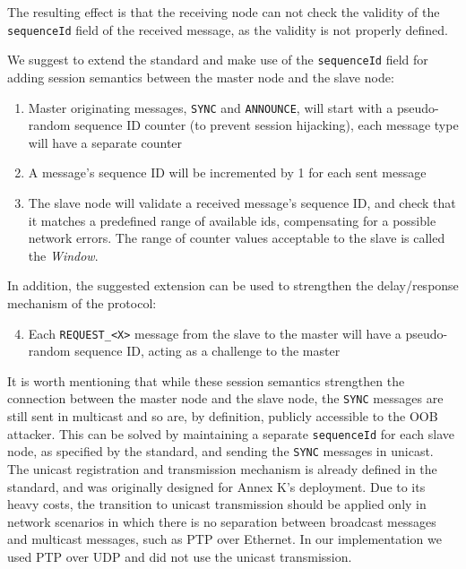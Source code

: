 \documentclass[11pt]{article}
\begin{document}
The resulting effect is that the receiving node can not check the validity of the \texttt{sequenceId} field of the received message, as the validity is not properly defined.



We suggest to extend the standard and make use of the \texttt{sequenceId} field for adding session semantics between the master node and the slave node:

\begin{enumerate}

  \item Master originating messages, \texttt{SYNC} and \texttt{ANNOUNCE}, will start with a pseudo-random sequence ID counter (to prevent session hijacking), each message type will have a separate counter

  \item A message's sequence ID will be incremented by 1 for each sent message

  \item The slave node will validate a received message's sequence ID, and check that it matches a predefined range of available ids, compensating for a possible network errors. The range of counter values acceptable to the slave is called the \emph{Window}.

\end{enumerate}



In addition, the suggested extension can be used to strengthen the delay/response mechanism of the protocol:

\begin{enumerate}

  \setcounter{enumi}{3}

  \item Each \texttt{REQUEST_<X>} message from the slave to the master will have a pseudo-random sequence ID, acting as a challenge to the master

\end{enumerate}



It is worth mentioning that while these session semantics strengthen the connection between the master node and the slave node, the \texttt{SYNC} messages are still sent in multicast and so are, by definition, publicly accessible to the OOB attacker. This can be solved by maintaining a separate \texttt{sequenceId} for each slave node, as specified by the standard, and sending the \texttt{SYNC} messages in unicast. The unicast registration and transmission mechanism is already defined in the standard, and was originally designed for Annex K's deployment. Due to its heavy costs, the transition to unicast transmission should be applied only in network scenarios in which there is no separation between broadcast messages and multicast messages, such as PTP over Ethernet. In our implementation we used PTP over UDP and did not use the unicast transmission.
\end{document}
